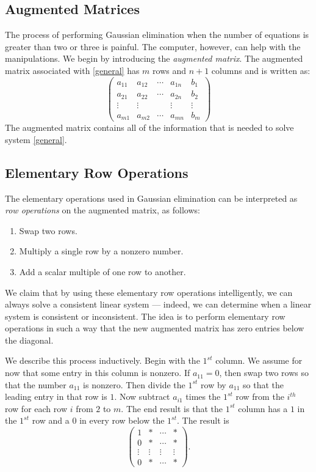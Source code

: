 \documentclass{ximera}
\begin{document}
\subsection*{Augmented Matrices}

The process of performing Gaussian elimination when the number
of equations is greater than two or three is painful.  The
computer, however, can help with the manipulations.  We begin by
introducing the {\em augmented matrix\/}. 
The augmented matrix associated with \eqref{general} has
$m$ rows and $n+1$ columns and is written as:
\begin{equation}  \label{augmented}
\left(
\begin{array}{rrrr|r}
 a_{11} & a_{12} & \cdots & a_{1n} &  b_1 \\
 a_{21} & a_{22} & \cdots & a_{2n} &  b_2 \\
 \vdots & \vdots &        & \vdots & \vdots \\
 a_{m1} & a_{m2} & \cdots & a_{mn} &  b_m
\end{array}
\right)
\end{equation}
The augmented matrix contains all of the information that is
needed to solve system \eqref{general}.

\subsection*{Elementary Row Operations} 

The elementary operations used in Gaussian elimination
can be interpreted as {\em row operations\/} on
the augmented matrix, as follows:
\begin{enumerate}
\item   Swap two rows.
\item   Multiply a single row by a nonzero number.
\item   Add a scalar multiple of one row to another.
\end{enumerate}
We claim that by using these elementary row operations
intelligently, we can always solve a consistent linear system
--- indeed, we can determine when a linear system is consistent
or inconsistent.  The idea is to perform elementary row
operations in such a way that the new augmented matrix has zero
entries below the diagonal.

We describe this process inductively.  Begin with the $1^{st}$
column.  We assume for now that some entry in this column is
nonzero.  If $a_{11}=0$, then swap two rows so that the
number $a_{11}$ is nonzero.  Then divide the $1^{st}$ row by
$a_{11}$ so that the leading entry in that row is $1$.  Now
subtract $a_{i1}$ times the $1^{st}$ row from the $i^{th}$ row
for each row $i$ from $2$ to $m$.  The end result is that the
$1^{st}$ column has a $1$ in the $1^{st}$ row and a $0$ in every
row below the $1^{st}$.  The result is
\[
\left(\begin{array}{cccc}  1 & * & \cdots & * \\
0 & * & \cdots & * \\ \vdots & \vdots & \vdots & \vdots \\
0 & * & \cdots & * \end{array} \right).
\]
\end{document}
